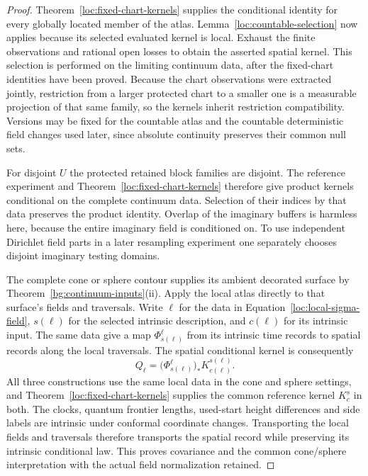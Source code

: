 \begin{proof}
Theorem~\ref{loc:fixed-chart-kernels} supplies the conditional identity
for every globally located member of the atlas.
Lemma~\ref{loc:countable-selection} now applies because its selected
evaluated kernel is local.  Exhaust the finite observations and rational
open losses to obtain the asserted spatial kernel.  This selection is
performed on the limiting continuum data, after the fixed-chart
identities have been proved.  Because the chart observations were
extracted jointly, restriction from a larger protected chart to a smaller
one is a measurable projection of that same family, so the kernels
inherit restriction compatibility.  Versions may be fixed for the
countable atlas and the countable deterministic field changes used
later, since absolute continuity preserves their common null sets.

For disjoint $U$ the protected retained block families are disjoint.
The reference experiment and Theorem~\ref{loc:fixed-chart-kernels}
therefore give product kernels conditional on the complete continuum
data.  Selection of their indices by that data preserves the product
identity.  Overlap of the imaginary buffers is harmless here, because
the entire imaginary field is conditioned on.  To use independent
Dirichlet field parts in a later resampling experiment one separately
chooses disjoint imaginary testing domains.

The complete cone or sphere contour supplies its ambient decorated
surface by Theorem~\ref{bg:continuum-inputs}(ii).  Apply the local atlas
directly to that surface's fields and traversals.  Write $\ell$ for
the data in Equation~\eqref{loc:local-sigma-field}, $s(\ell)$ for
the selected intrinsic description, and $c(\ell)$ for its intrinsic
input.  The same data give a map $\Phi_{s(\ell)}^\ell$ from its
intrinsic time records to spatial records along the local traversals.
The spatial conditional kernel is consequently
\[
 Q_\ell
   =\bigl(\Phi_{s(\ell)}^\ell\bigr)_*
       K^{s(\ell)}_{c(\ell)}.
\]
All three constructions use the same local data in the cone and sphere
settings, and Theorem~\ref{loc:fixed-chart-kernels} supplies the common
reference kernel $K^s_c$ in both.  The clocks, quantum frontier lengths,
used-start height differences and side labels are intrinsic under
conformal coordinate changes.  Transporting the local fields and
traversals therefore transports the spatial record while preserving
its intrinsic conditional law.  This proves covariance and the common
cone/sphere interpretation with the actual field normalization retained.
\end{proof}

